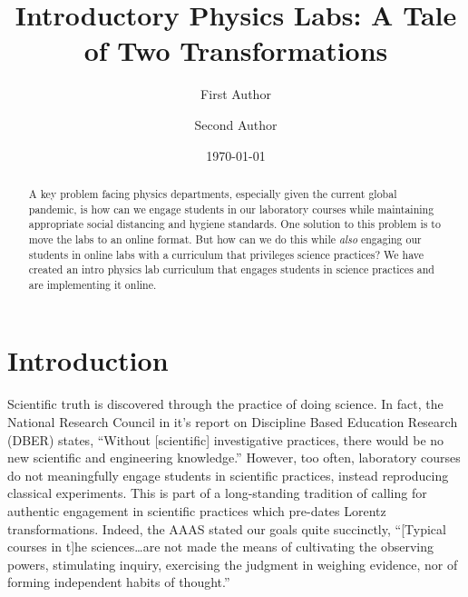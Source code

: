 \documentclass[aip, numerical, preprint]{revtex4-2}
\begin{document}
\title{Introductory Physics Labs: A Tale of Two Transformations}


\author{First Author}  \author{Second Author}

\date{\today}


\begin{abstract}
  A key problem facing physics departments, especially given the current global pandemic, is
  how can we engage students in our laboratory courses while maintaining appropriate social
  distancing and hygiene standards.  One solution to this problem is to move the labs to an
  online format.  But how can we do this while \textit{also} engaging our students in online
  labs with a curriculum that privileges science practices?  We have created an intro physics
  lab curriculum that engages students in science practices and are implementing it online.
\end{abstract}

\maketitle

\section{Introduction}
Scientific truth is discovered through the practice of doing science.  In fact, the National
Research Council in it's report on Discipline Based Education Research (DBER) states, ``Without
[scientific] investigative practices, there would be no new scientific and engineering
knowledge.''\cite{DBERreport} However, too often, laboratory courses do not meaningfully engage
students in scientific practices, instead reproducing classical experiments.\cite{PCAST12} This
is part of a long-standing tradition of calling for authentic engagement in scientific
practices which pre-dates Lorentz transformations.\cite{AAAS1881} Indeed, the AAAS stated our
goals quite succinctly, ``[Typical courses in t]he sciences\ldots are not made the means of
cultivating the observing powers, stimulating inquiry, exercising the judgment in weighing
evidence, nor of forming independent habits of thought.''\cite{AAAS1881}
\end{document}
